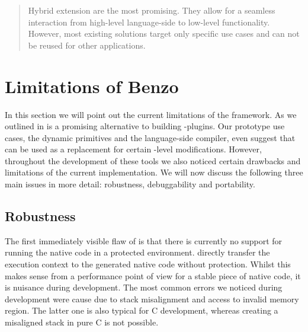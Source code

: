 \begin{quote}
Hybrid extension are the most promising.
They allow for a seamless interaction from high-level language-side to low-level functionality.
However, most existing solutions target only specific use cases and can not be reused for other applications.
\end{quote}


\section{Limitations of Benzo}
In this section we will point out the current limitations of the \B framework.
As we outlined in  \B is a promising alternative to building \VM-plugins.
Our prototype use cases, the dynamic primitives and the language-side \JIT compiler, even suggest that \B can be used as a replacement for certain \VM-level modifications.
However, throughout the development of these tools we also noticed certain drawbacks and limitations of the current \B implementation.
We will now discuss the following three main issues in more detail: robustness, debuggability and portability.

\subsection{Robustness}

The first immediately visible flaw of \B is that there is currently no support for running the native code in a protected environment.
\B directly transfer the execution context to the generated native code without protection.
Whilst this makes sense from a performance point of view for a stable piece of native code, it is nuisance during development.
The most common errors we noticed during development were cause due to stack misalignment and access to invalid memory region.
The latter one is also typical for C development, whereas creating a misaligned stack in pure C is not possible.

